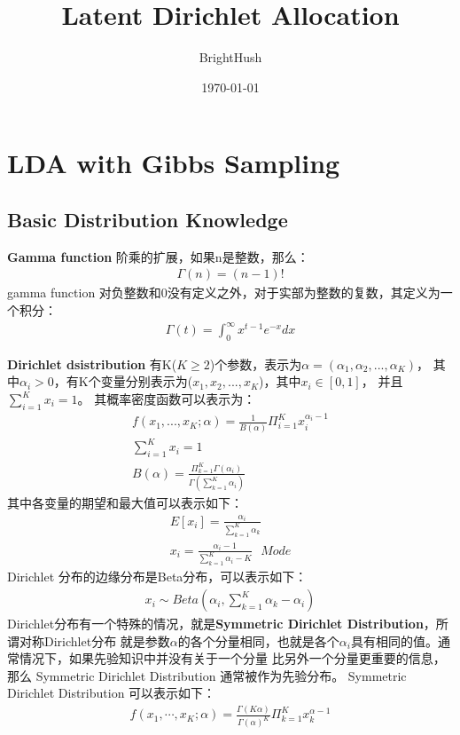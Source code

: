 \documentclass[UTF8]{ctexart}
\title{Latent Dirichlet Allocation}
\author{BrightHush}
\date{\today}
\begin{document}
\maketitle
\tableofcontents

\pagestyle{fancy}
\cfoot{\thepage}

\newcommand{\figref}[1]{\figurename~\ref{#1}}

\section{LDA with Gibbs Sampling}

\subsection{Basic Distribution Knowledge}
\textbf{Gamma function} 阶乘的扩展，如果n是整数，那么：
\begin{align}
\Gamma(n) = (n-1)!
\end{align}
gamma function 对负整数和0没有定义之外，对于实部为整数的复数，其定义为一个积分：
\begin{align}
\Gamma(t) = \int_{0}^{\infty}x^{t-1}e^{-x}dx
\end{align}
\par
\textbf{Dirichlet dsistribution} 有K($K \geq 2$)个参数，表示为$\alpha = (\alpha_1, \alpha_2, ..., \alpha_K)$，
其中$\alpha_i > 0$，有K个变量分别表示为($x_1, x_2, ..., x_K$)，其中$x_i \in \left[0, 1 \right]$，
并且$\sum_{i=1}^K x_i = 1$。
其概率密度函数可以表示为：
\begin{align}
f(x_1, ..., x_K; \alpha) = \frac{1}{B(\alpha)} \Pi_{i=1}^K x_{i}^{\alpha_i - 1}
\\
\sum_{i=1}^K x_i = 1
\\
B(\alpha) = \frac{\Pi_{k=1}^K \Gamma(\alpha_i)}{\Gamma(\sum_{k=1}^K \alpha_i)}
\end{align}
其中各变量的期望和最大值可以表示如下：
\begin{align}
E\left[ x_i \right] = \frac{\alpha_i}{\sum_{k=1}^K \alpha_k}
\\
x_i = \frac{\alpha_i - 1}{\sum_{k=1}^K \alpha_i - K} \ \ \ Mode
\end{align}
Dirichlet 分布的边缘分布是Beta分布，可以表示如下：
\begin{align}
x_i \sim Beta(\alpha_i, \sum_{k=1}^K \alpha_k - \alpha_i)
\end{align}
Dirichlet分布有一个特殊的情况，就是\textbf{Symmetric Dirichlet Distribution}，所谓对称Dirichlet分布
就是参数$\alpha$的各个分量相同，也就是各个$\alpha_i$具有相同的值。通常情况下，如果先验知识中并没有关于一个分量
比另外一个分量更重要的信息，那么 Symmetric Dirichlet Distribution 通常被作为先验分布。
Symmetric Dirichlet Distribution
可以表示如下：
\begin{align}
f(x_1, \cdots, x_K; \alpha) = \frac{\Gamma(K\alpha)}{\Gamma(\alpha)^K} \Pi_{k=1}^K x_k^{\alpha-1}
\end{align}
\end{document}
